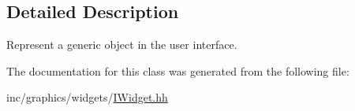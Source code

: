 \subsection{Detailed Description}
Represent a generic object in the user interface. 

The documentation for this class was generated from the following file\+:\begin{DoxyCompactItemize}
\item 
inc/graphics/widgets/\hyperlink{IWidget_8hh}{I\+Widget.\+hh}\end{DoxyCompactItemize}
